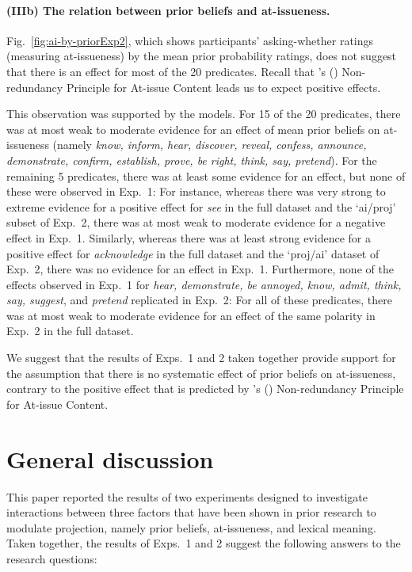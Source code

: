 \documentclass[11pt,fleqn]{article}
\newcommand{\6}{\mbox{$[\hspace*{-.6mm}[$}}
\newcommand{\9}{\mbox{$]\hspace*{-.6mm}]$}}
\newcommand{\citetpos}[1]{\citeauthor{#1}'s (\citeyear{#1})}
\begin{document}
\paragraph{(IIIb) The relation between prior beliefs and at-issueness.} 

Fig.~\ref{fig:ai-by-priorExp2}, which shows participants' asking-whether ratings (measuring at-issueness) by the mean prior probability ratings, does not suggest that there is an effect for most of the 20 predicates. Recall that \citetpos{tonhauser-etal-eval} Non-redundancy Principle for At-issue Content leads us to expect positive effects.

This observation was supported by the models. For 15 of the 20 predicates, there was at most weak to moderate evidence for an effect of mean prior beliefs on at-issueness (namely {\em know, inform, hear, discover, reveal, confess, announce, demonstrate, confirm, establish, prove, be right, think, say, pretend}). For the remaining 5 predicates, there was at least some evidence for an effect, but none of these were observed in Exp.~1: For instance, whereas there was very strong to extreme evidence for a positive effect for {\em see} in the full dataset and the `ai/proj' subset of Exp.~2, there was at most weak to moderate evidence for a negative effect in Exp.~1. Similarly, whereas there was at least strong evidence for a positive effect for {\em acknowledge} in the full dataset and the `proj/ai' dataset of Exp.~2, there was no evidence for an effect in Exp.~1. Furthermore, none of the effects observed in Exp.~1 for {\em hear, demonstrate, be annoyed, know, admit, think, say, suggest}, and {\em pretend} replicated in Exp.~2: For all of these predicates, there was at most weak to moderate evidence for an effect of the same polarity in Exp.~2 in the full dataset. 

We suggest that the results of Exps.~1 and 2 taken together provide support for the assumption that there is no systematic effect of prior beliefs on at-issueness, contrary to the positive effect that is predicted by \citetpos{tonhauser-etal-eval} Non-redundancy Principle for At-issue Content.

\section{General discussion}\label{s4}

This paper  reported the results of two experiments designed to investigate interactions between three factors that have been shown in prior research to modulate projection, namely prior beliefs, at-issueness, and lexical meaning. Taken together, the results of Exps.~1 and 2 suggest the following answers to the research questions:
\end{document}
